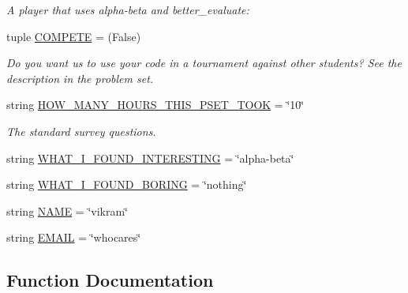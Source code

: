 \begin{DoxyCompactItemize}
\begin{DoxyCompactList}\small\item\em A player that uses alpha-\/beta and better\+\_\+evaluate\+: \end{DoxyCompactList}\item 
tuple \hyperlink{namespacelab3_a507ef68d63a202cdd769b53df79cf163}{C\+O\+M\+P\+E\+T\+E} = (False)
\begin{DoxyCompactList}\small\item\em Do you want us to use your code in a tournament against other students? See the description in the problem set. \end{DoxyCompactList}\item 
string \hyperlink{namespacelab3_ac15f588150b4ba8f99f8b305c86527cc}{H\+O\+W\+\_\+\+M\+A\+N\+Y\+\_\+\+H\+O\+U\+R\+S\+\_\+\+T\+H\+I\+S\+\_\+\+P\+S\+E\+T\+\_\+\+T\+O\+O\+K} = \char`\"{}10\char`\"{}
\begin{DoxyCompactList}\small\item\em The standard survey questions. \end{DoxyCompactList}\item 
string \hyperlink{namespacelab3_ac6298332137ba3ffbfa88449a0d8add2}{W\+H\+A\+T\+\_\+\+I\+\_\+\+F\+O\+U\+N\+D\+\_\+\+I\+N\+T\+E\+R\+E\+S\+T\+I\+N\+G} = \char`\"{}alpha-\/beta\char`\"{}
\item 
string \hyperlink{namespacelab3_a2d4ca0461367d56429a6e110bdc70c9c}{W\+H\+A\+T\+\_\+\+I\+\_\+\+F\+O\+U\+N\+D\+\_\+\+B\+O\+R\+I\+N\+G} = \char`\"{}nothing\char`\"{}
\item 
string \hyperlink{namespacelab3_a2d13719e09eaf808047d497d45dff575}{N\+A\+M\+E} = \char`\"{}vikram\char`\"{}
\item 
string \hyperlink{namespacelab3_a3cd2b5e83c71f1b3c2f453bea62b3af5}{E\+M\+A\+I\+L} = \char`\"{}whocares\char`\"{}
\end{DoxyCompactItemize}


\subsection{Function Documentation}
\hypertarget{namespacelab3_a30824a87848607d82381e77631ca275b}{}
